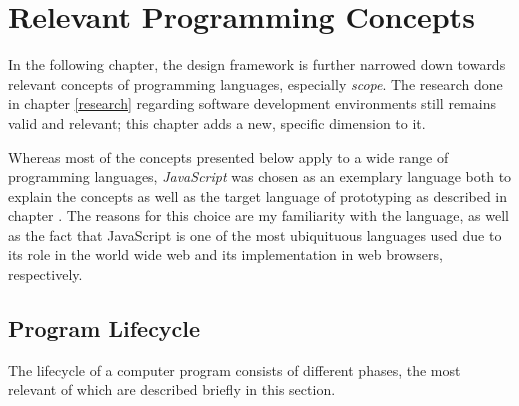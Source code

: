 \chapter{Relevant Programming Concepts}\label{concepts}

In the following chapter, the design framework is further narrowed down
towards relevant concepts of programming languages, especially
\emph{scope}. The research done in chapter \ref{research} regarding
software development environments still remains valid and relevant; this
chapter adds a new, specific dimension to it.

Whereas most of the concepts presented below apply to a wide range of
programming languages, \emph{JavaScript} was chosen as an exemplary
language both to explain the concepts as well as the target language of
prototyping as described in chapter . The reasons for
this choice are my familiarity with the language, as well as the fact
that JavaScript is one of the most ubiquituous languages used due to its
role in the world wide web and its implementation in web browsers,
respectively.

\section{Program Lifecycle}\label{program-lifecycle}

The lifecycle of a computer program consists of different phases, the
most relevant of which are described briefly in this section.

